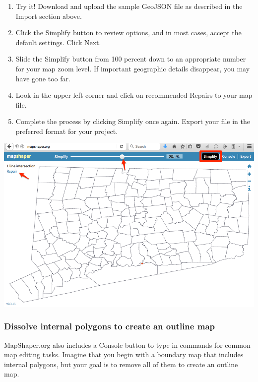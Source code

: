\documentclass[
  english,
]{book}
\begin{document}
\begin{enumerate}
\def\labelenumi{\arabic{enumi}.}
\item
  Try it! Download and upload the sample GeoJSON file as described in the Import section above.
\item
  Click the Simplify button to review options, and in most cases, accept the default settings. Click Next.
\item
  Slide the Simplify button from 100 percent down to an appropriate number for your map zoom level. If important geographic details disappear, you may have gone too far.
\item
  Look in the upper-left corner and click on recommended Repairs to your map file.
\item
  Complete the process by clicking Simplify once again. Export your file in the preferred format for your project.
\end{enumerate}

\includegraphics{images/09-transform/mapshaper-simplify.png}

\hypertarget{dissolve-internal-polygons-to-create-an-outline-map}{%
\subsubsection*{Dissolve internal polygons to create an outline map}\label{dissolve-internal-polygons-to-create-an-outline-map}}

MapShaper.org also includes a Console button to type in commands for common map editing tasks. Imagine that you begin with a boundary map that includes internal polygons, but your goal is to remove all of them to create an outline map.
\end{document}
